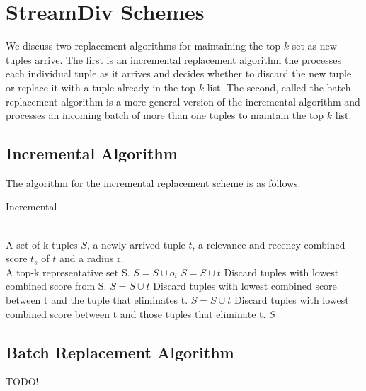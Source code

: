 \section{StreamDiv Schemes}
We discuss two replacement algorithms for maintaining the top $k$ set as new tuples arrive. The first is an incremental replacement algorithm the processes each individual tuple as it arrives and decides whether to discard the new tuple or replace it with a tuple already in the top $k$ list. The second, called the batch replacement algorithm is a more general version of the incremental algorithm and processes an incoming batch of more than one tuples to maintain the top $k$ list.

\subsection{Incremental Algorithm}
The algorithm for the incremental replacement scheme is as follows:
\begin{algorithm}
\caption{Incremental }
\label{alg:Incremental}
\begin{algorithmic}[1]
\REQUIRE ~~\\
A set of k tuples $S$, a newly arrived tuple $t$, a relevance and recency combined score $t_s$ of $t$ and a radius r.
\ENSURE ~~\\
A top-k representative set S.
\STATE $S = S \cup {o_i}$
\ELSE
{}
\STATE $S = S \cup{t}$
\STATE Discard tuples with lowest combined score from S.
\ENDIF
{}
\STATE $S = S \cup{t}$
\STATE Discard tuples with lowest combined score between t and the tuple that eliminates t.
\ENDIF
{}
\STATE $S = S \cup{t}$
\STATE Discard tuples with lowest combined score between t and those tuples that eliminate t.
\ENDIF
\ENDIF
{} $S$
\end{algorithmic}
\end{algorithm}

\subsection{Batch Replacement Algorithm}

TODO!
